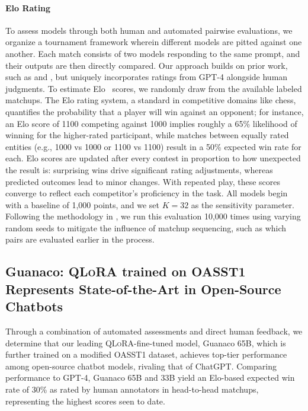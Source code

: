 \paragraph{Elo Rating} To assess models through both human and automated pairwise evaluations, we organize a tournament framework wherein different models are pitted against one another. Each match consists of two models responding to the same prompt, and their outputs are then directly compared. Our approach builds on prior work, such as \citet{bai2022training} and \citet{vicuna2023}, but uniquely incorporates ratings from GPT-4 alongside human judgments. To estimate Elo~\citep{elo1967proposed,elo1978rating} scores, we randomly draw from the available labeled matchups. The Elo rating system, a standard in competitive domains like chess, quantifies the probability that a player will win against an opponent; for instance, an Elo score of 1100 competing against 1000 implies roughly a 65\% likelihood of winning for the higher-rated participant, while matches between equally rated entities (e.g., 1000 vs 1000 or 1100 vs 1100) result in a 50\% expected win rate for each. Elo scores are updated after every contest in proportion to how unexpected the result is: surprising wins drive significant rating adjustments, whereas predicted outcomes lead to minor changes. With repeated play, these scores converge to reflect each competitor’s proficiency in the task. All models begin with a baseline of 1,000 points, and we set $K=32$ as the sensitivity parameter. Following the methodology in \citet{vicuna2023}, we run this evaluation 10,000 times using varying random seeds to mitigate the influence of matchup sequencing, such as which pairs are evaluated earlier in the process.

\subsection{\textbf{Guanaco}: \textsc{QLoRA} trained on OASST1 Represents State-of-the-Art in Open-Source Chatbots}

Through a combination of automated assessments and direct human feedback, we determine that our leading \textsc{QLoRA}-fine-tuned model, {Guanaco} 65B, which is further trained on a modified OASST1 dataset, achieves top-tier performance among open-source chatbot models, rivaling that of ChatGPT. Comparing performance to GPT-4, {Guanaco} 65B and 33B yield an Elo-based expected win rate of 30\% as rated by human annotators in head-to-head matchups, representing the highest scores seen to date.

